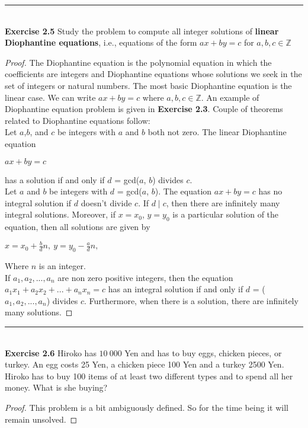 \documentclass{article}
\begin{document}
\noindent\rule{12cm}{0.4pt}\\
\noindent \textbf{Exercise 2.5} Study the problem to compute all integer solutions of \textbf{linear Diophantine equations}, i.e., equations of the form $ax + by = c$ for $a, b, c \in \mathbb{Z}$
\begin{proof}
The Diophantine equation is the polynomial equation in which the coefficients are integers and Diophantine equations whose solutions we seek in the set of integers or natural numbers. The most basic Diophantine equation is the linear case. We can write $ax + by = c$ where $a, b, c \in \mathbb{Z}$. An example of Diophantine equation problem is given in \textbf{Exercise 2.3}. Couple of theorems related to Diophantine equations follow: \\
Let $a$,$b$, and $c$ be integers with $a$ and $b$ both not zero. The linear Diophantine equation
\begin{center}
$ax + by = c$
\end{center}
has a solution if and only if $d$ = gcd($a$, $b$) divides $c$.\\
Let $a$ and $b$ be integers with $d$ = gcd($a$, $b$). The equation $ax + by = c$ has no integral solution if $d$ doesn’t divide $c$. If $d \mid c$, then there are infinitely many integral solutions. Moreover, if $x = x_0$, $y = y_0$ is a particular solution of the equation, then all solutions are given by 
\begin{center}
$x = x_0 + \frac{b}{d}n,\ y=y_0 - \frac{a}{d}n,$
\end{center}
Where $n$ is an integer.\\
If $a_1, a_2,..., a_n$ are non zero positive integers, then the equation $a_1x_1 + a_2x_2 +...+ a_nx_n = c$ has an integral solution if and only if $d$ = ($a_1, a_2,..., a_n$) divides $c$. Furthermore, when there is a solution, there are infinitely many solutions.
\end{proof}



\noindent\rule{12cm}{0.4pt}\\
\noindent \textbf{Exercise 2.6} Hiroko has $10\ 000$ Yen and has to buy eggs, chicken pieces, or turkey. An egg costs 25 Yen, a chicken piece 100 Yen and a turkey 2500 Yen. Hiroko has to buy 100 items of at least two different types and to spend all her money. What is she buying?
\begin{proof}
This problem is a bit ambiguously defined. So for the time being it will remain unsolved.
\end{proof}
\end{document}
